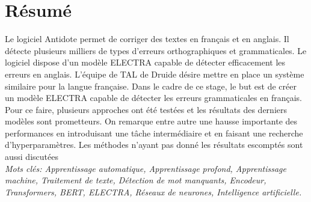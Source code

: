 \documentclass[12pt,twoside,maitrise]{dms}
\theoremstyle{definition}
\numberwithin{equation}{section}
\numberwithin{table}{chapter}
\numberwithin{figure}{chapter}
\begin{document}

\maketitle

\maketitle


\francais

\chapter*{Résumé}
Le logiciel Antidote permet de corriger des textes en français et en anglais.
Il détecte plusieurs milliers de types d’erreurs orthographiques et
grammaticales. Le logiciel dispose d'un modèle ELECTRA capable de détecter
efficacement les erreurs en anglais. L'équipe de TAL de Druide désire mettre en
place un système similaire pour la langue française. Dans le cadre de ce stage,
le but est de créer un modèle ELECTRA capable de détecter les erreurs
grammaticales en français. Pour ce faire, plusieurs approches ont été testées
et les résultats des derniers modèles sont prometteurs. On remarque entre autre
une hausse importante des performances en introduisant une tâche intermédiaire
et en faisant une recherche d'hyperparamètres. Les méthodes n'ayant pas donné
les résultats escomptés sont aussi discutées \\

\textit{Mots clés: Apprentissage automatique, Apprentissage profond,
	Apprentissage machine, Traitement de texte, Détection de mot manquants,
	Encodeur, Transformers, BERT, ELECTRA, Réseaux de neurones, Intelligence
	artificielle.}

\end{document}
